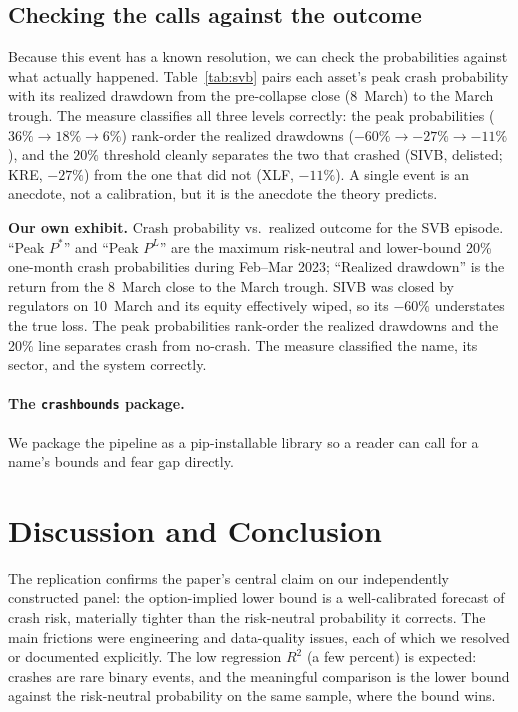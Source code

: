 \documentclass[12pt]{article}
\newcommand{\exhibitbreak}{\clearpage}
\newenvironment{leadin}%
  {\par\small\setlength{\columnsep}{20pt}%
   \setlength{\multicolsep}{3pt plus 1pt minus 1pt}%
   \setlength{\premulticols}{0pt}\setlength{\postmulticols}{0pt}%
   \begin{multicols}{2}}%
  {\end{multicols}\par\normalsize}
\begin{document}
\subsection{Checking the calls against the outcome}
\begin{leadin}
Because this event has a known resolution, we can check the probabilities against what
actually happened. Table~\ref{tab:svb} pairs each asset's peak crash probability with
its realized drawdown from the pre-collapse close (8~March) to the March trough. The
measure classifies all three levels correctly: the peak probabilities
($36\% \to 18\% \to 6\%$) rank-order the realized drawdowns
($-60\% \to -27\% \to -11\%$), and the $20\%$ threshold cleanly separates the two that
crashed (SIVB, delisted; KRE, $-27\%$) from the one that did not (XLF, $-11\%$). A
single event is an anecdote, not a calibration, but it is the anecdote the theory
predicts.
\end{leadin}
\begin{table}[H]
\centering
\small
\caption[SVB: probability vs.\ outcome]{\textbf{Our own exhibit.} Crash probability
vs.\ realized outcome for the SVB episode. ``Peak $P^*$'' and ``Peak $P^L$'' are the
maximum risk-neutral and lower-bound 20\% one-month crash probabilities during
Feb--Mar 2023; ``Realized drawdown'' is the return from the 8~March close to the March
trough. SIVB was closed by regulators on 10~March and its equity effectively wiped, so
its $-60\%$ understates the true loss. The peak probabilities rank-order the realized
drawdowns and the 20\% line separates crash from no-crash. The measure classified
the name, its sector, and the system correctly.}
\label{tab:svb}

\end{table}
\exhibitbreak

\paragraph{The \texttt{crashbounds} package.} We package the pipeline as a
pip-installable library so a reader can call for a name's bounds and fear gap
directly.

\section{Discussion and Conclusion}
The replication confirms the paper's central claim on our independently
constructed panel: the option-implied lower bound is a well-calibrated forecast of
crash risk, materially tighter than the risk-neutral probability it corrects. The
main frictions were engineering and data-quality issues, each of which we resolved 
or documented explicitly. The low regression $R^2$ (a few percent) is expected: crashes 
are rare binary events, and the meaningful comparison is the lower bound against the 
risk-neutral probability on the same sample, where the bound wins.
\end{document}
